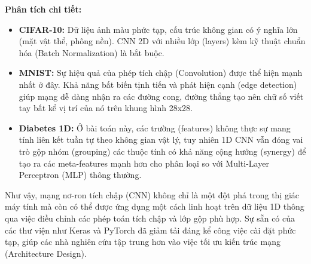\textbf{Phân tích chi tiết:}
\begin{itemize}
    \item \textbf{CIFAR-10:} Dữ liệu ảnh màu phức tạp, cấu trúc không gian có ý nghĩa lớn (mặt vật thể, phông nền). CNN 2D với nhiều lớp (layers) kèm kỹ thuật chuẩn hóa (Batch Normalization) là bắt buộc.
    \item \textbf{MNIST:} Sự hiệu quả của phép tích chập (Convolution) được thể hiện mạnh nhất ở đây. Khả năng bất biến tịnh tiến và phát hiện cạnh (edge detection) giúp mạng dễ dàng nhận ra các đường cong, đường thẳng tạo nên chữ số viết tay bất kể vị trí của nó trên khung hình 28x28.
    \item \textbf{Diabetes 1D:} Ở bài toán này, các trường (features) không thực sự mang tính liên kết tuần tự theo không gian vật lý, tuy nhiên 1D CNN vẫn đóng vai trò gộp nhóm (grouping) các thuộc tính có khả năng cộng hưởng (synergy) để tạo ra các meta-features mạnh hơn cho phân loại so với Multi-Layer Perceptron (MLP) thông thường.
\end{itemize}

Như vậy, mạng nơ-ron tích chập (CNN) không chỉ là một đột phá trong thị giác máy tính mà còn có thể được ứng dụng một cách linh hoạt trên dữ liệu 1D thông qua việc điều chỉnh các phép toán tích chập và lớp gộp phù hợp. Sự sẵn có của các thư viện như Keras và PyTorch đã giảm tải đáng kể công việc cài đặt phức tạp, giúp các nhà nghiên cứu tập trung hơn vào việc tối ưu kiến trúc mạng (Architecture Design).
